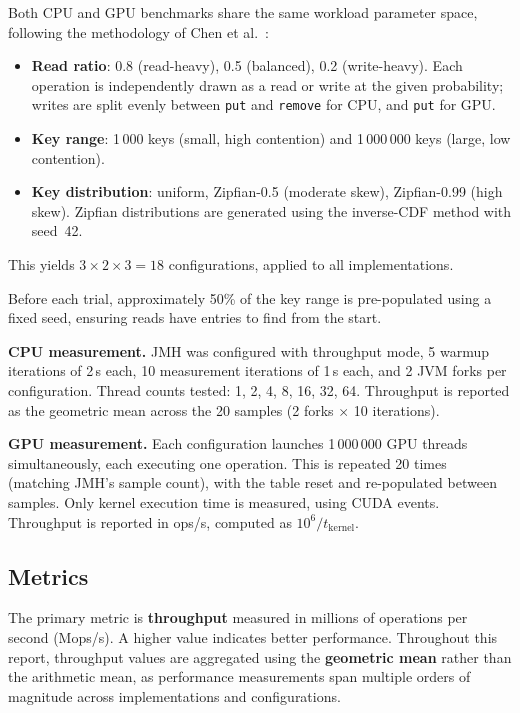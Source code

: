\documentclass[11pt,a4paper]{article}
\begin{document}
Both CPU and GPU benchmarks share the same workload parameter space,
following the methodology of Chen et al.~\cite{chen2018}:

\begin{itemize}
  \item \textbf{Read ratio}: 0.8 (read-heavy), 0.5 (balanced), 0.2 (write-heavy).
        Each operation is independently drawn as a read or write at the given
        probability; writes are split evenly between \texttt{put} and
        \texttt{remove} for CPU, and \texttt{put} for GPU.
  \item \textbf{Key range}: 1\,000 keys (small, high contention) and
        1\,000\,000 keys (large, low contention).
  \item \textbf{Key distribution}: uniform, Zipfian-0.5 (moderate skew),
        Zipfian-0.99 (high skew). Zipfian distributions are generated using
        the inverse-CDF method with seed~42.
\end{itemize}

This yields $3 \times 2 \times 3 = 18$ configurations, applied to all
implementations.

Before each trial, approximately 50\% of the key range is pre-populated using
a fixed seed, ensuring reads have entries to find from the start.

\textbf{CPU measurement.} JMH was configured with throughput mode, 5 warmup
iterations of 2\,s each, 10 measurement iterations of 1\,s each, and 2 JVM
forks per configuration. Thread counts tested: 1, 2, 4, 8, 16, 32, 64.
Throughput is reported as the geometric mean across the 20 samples (2
forks $\times$ 10 iterations).

\textbf{GPU measurement.} Each configuration launches 1\,000\,000 GPU
threads simultaneously, each executing one operation. This is repeated 20
times (matching JMH's sample count), with the table reset and re-populated
between samples. Only kernel execution time is measured, using CUDA events.
Throughput is reported in ops/s, computed as
$10^6 / t_\text{kernel}$.

\subsection{Metrics}

The primary metric is \textbf{throughput} measured in millions of operations
per second (Mops/s). A higher value indicates better performance. Throughout
this report, throughput values are aggregated using the \textbf{geometric mean}
rather than the arithmetic mean, as performance measurements span multiple
orders of magnitude across implementations and configurations.
\end{document}
